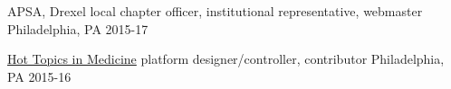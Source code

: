 
\begin{cvhonors}

\cvhonor
{APSA, Drexel local chapter}
{officer, institutional representative, webmaster}
{Philadelphia, PA}
{2015-17}

\cvhonor
{\href{}{Hot Topics in Medicine}}
{platform designer/controller, contributor}
{Philadelphia, PA}
{2015-16}
\end{cvhonors}